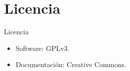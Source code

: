 \documentclass[spanish]{beamer}
\begin{document}
\section{Licencia}
\begin{frame}{Licencia}
   \begin{itemize}
         \item Software: GPLv3.
         \item Documentación: Creative Commons.
   \end{itemize}
\end{frame}


\end{document}

